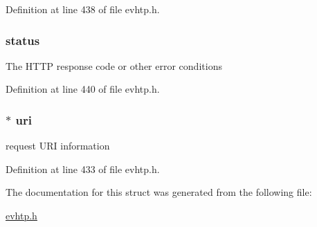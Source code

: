 Definition at line 438 of file evhtp.\-h.

\hypertarget{structevhtp__request__s_a9342eb644f9122b975cf9e2aed3cc00c}{
\subsubsection[{status}]{ status}}\label{structevhtp__request__s_a9342eb644f9122b975cf9e2aed3cc00c}
The H\-T\-T\-P response code or other error conditions 

Definition at line 440 of file evhtp.\-h.

\hypertarget{structevhtp__request__s_adfdac9f1ecf15761c62699a52d855a49}{
\subsubsection[{uri}]{$\ast$ uri}}\label{structevhtp__request__s_adfdac9f1ecf15761c62699a52d855a49}
request U\-R\-I information 

Definition at line 433 of file evhtp.\-h.



The documentation for this struct was generated from the following file\-:\begin{DoxyCompactItemize}
\item 
\hyperlink{evhtp_8h}{evhtp.\-h}\end{DoxyCompactItemize}
